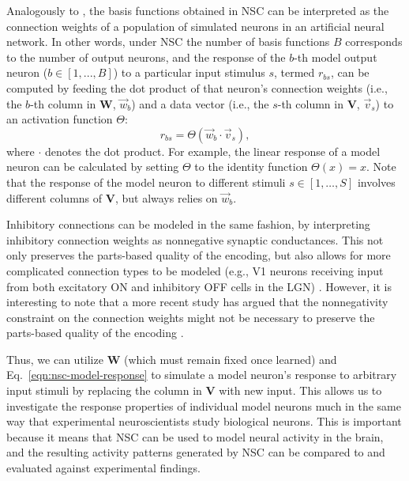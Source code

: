 
Analogously to \cite{OlshausenField1996,OlshausenField1997},
the basis functions obtained in \ac{NSC} can be interpreted as
the connection weights of a population of simulated neurons
in an artificial neural network.
In other words, under \ac{NSC} the number of basis functions $B$ 
corresponds to the number of output neurons, and the
response of the $b$-th model output neuron
($b \in [1, ..., B]$)
to a particular input stimulus $s$, termed $r_{bs}$,
can be computed by feeding the dot product of
that neuron's connection weights
(i.e., the $b$-th column in $\mathbf{W}$, $\vec{w}_b$)
and a data vector
(i.e., the $s$-th column in \textbf{V}, $\vec{v}_s$)
to an activation function $\Theta$:
\begin{equation}
r_{bs} = \Theta(\vec{w}_b \cdot \vec{v}_s),
\label{eqn:nsc-model-response}
\end{equation}
where $\cdot$ denotes the dot product.
For example, the linear response of a model neuron
can be calculated by setting $\Theta$ to the identity function $\Theta(x)=x$.
Note that the response of the model neuron to different stimuli 
$s \in [1, \ldots, S]$
involves different columns of \textbf{V},
but always relies on $\vec{w}_b$.

Inhibitory connections can be modeled in the same fashion,
by interpreting inhibitory connection weights
as nonnegative synaptic conductances.
This not only preserves the parts-based quality of the encoding,
but also allows for more complicated connection types to be modeled
(e.g., \ac{V1} neurons receiving input from both excitatory ON
and inhibitory OFF cells in the \ac{LGN}) \cite{Hoyer2003}.
However, it is interesting to note that a more recent study has argued
that the nonnegativity constraint on the
connection weights might not be necessary 
to preserve the parts-based quality of the encoding \cite{Liu2017}.


Thus, we can utilize \textbf{W} 
(which must remain fixed once learned)
and Eq.~\ref{eqn:nsc-model-response}
to simulate a model neuron's response to arbitrary input stimuli
by replacing the column in \textbf{V} with new input.
This allows us to investigate the response properties 
of individual model neurons
much in the same way that experimental neuroscientists 
study biological neurons.
This is important because it means that \ac{NSC} can be used to 
model neural activity in the brain, 
and the resulting activity patterns generated by \ac{NSC}
can be compared to and evaluated against experimental findings. 

